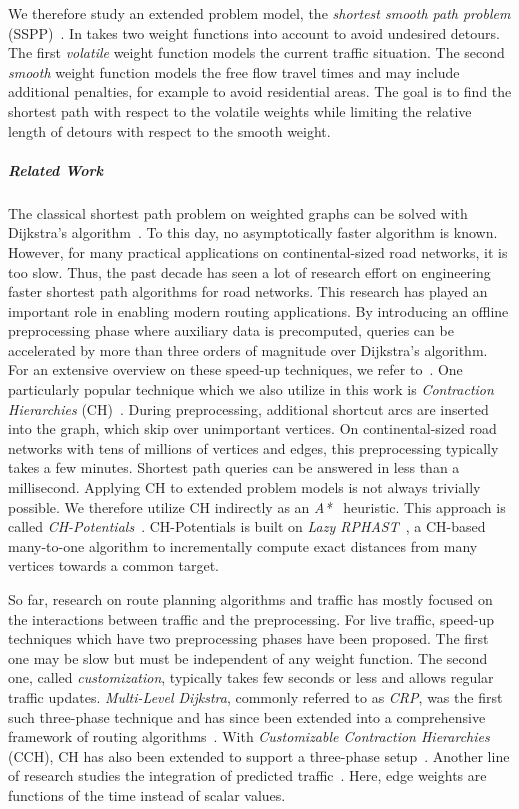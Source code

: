 \documentclass[a4paper,UKenglish,cleveref, autoref, thm-restate]{lipics-v2021}
\begin{document}
We therefore study an extended problem model, the \emph{shortest smooth path problem} (SSPP)~\cite{dss-tarrn-18}.
In takes two weight functions into account to avoid undesired detours.
The first \emph{volatile} weight function models the current traffic situation.
The second \emph{smooth} weight function models the free flow travel times and may include additional penalties, for example to avoid residential areas.
The goal is to find the shortest path with respect to the volatile weights while limiting the relative length of detours with respect to the smooth weight.

\subparagraph{Related Work}

The classical shortest path problem on weighted graphs can be solved with Dijkstra's algorithm~\cite{d-ntpcg-59}.
To this day, no asymptotically faster algorithm is known.
However, for many practical applications on continental-sized road networks, it is too slow.
Thus, the past decade has seen a lot of research effort on engineering faster shortest path algorithms for road networks.
This research has played an important role in enabling modern routing applications.
By introducing an offline preprocessing phase where auxiliary data is precomputed, queries can be accelerated by more than three orders of magnitude over Dijkstra's algorithm.
For an extensive overview on these speed-up techniques, we refer to~\cite{bdgmpsww-rptn-16}.
One particularly popular technique which we also utilize in this work is \emph{Contraction Hierarchies} (CH)~\cite{gssv-erlrn-12}.
During preprocessing, additional shortcut arcs are inserted into the graph, which skip over unimportant vertices.
On continental-sized road networks with tens of millions of vertices and edges, this preprocessing typically takes a few minutes.
Shortest path queries can be answered in less than a millisecond.
Applying CH to extended problem models is not always trivially possible.
We therefore utilize CH indirectly as an \emph{A*}~\cite{hnr-afbhd-68} heuristic.
This approach is called \emph{CH-Potentials}~\cite{strasser_et_al:LIPIcs.SEA.2021.6}.
CH-Potentials is built on \emph{Lazy RPHAST}~\cite{strasser_et_al:LIPIcs.SEA.2021.6}, a CH-based many-to-one algorithm to incrementally compute exact distances from many vertices towards a common target.

So far, research on route planning algorithms and traffic has mostly focused on the interactions between traffic and the preprocessing.
For live traffic, speed-up techniques which have two preprocessing phases have been proposed.
The first one may be slow but must be independent of any weight function.
The second one, called \emph{customization}, typically takes few seconds or less and allows regular traffic updates.
\emph{Multi-Level Dijkstra}, commonly referred to as \emph{CRP}, was the first such three-phase technique and has since been extended into a comprehensive framework of routing algorithms~\cite{bdgmpsww-rptn-16}.
With \emph{Customizable Contraction Hierarchies} (CCH), CH has also been extended to support a three-phase setup~\cite{dsw-cch-15}.
Another line of research studies the integration of predicted traffic~\cite{dn-crdtd-12,bgsv-mtdtt-13,bdpw-dtdrp-16,swz-sfert-21}.
Here, edge weights are functions of the time instead of scalar values.
\end{document}
